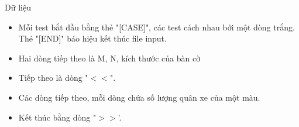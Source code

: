 Dữ liệu
\begin{itemize}
	\item     Mỗi test bắt đầu bằng thẻ "[CASE]", các test cách nhau bởi một dòng trắng. Thẻ "[END]" báo hiệu kết thúc file input.   
	\item     Hai dòng tiếp theo là M, N, kích thước của bàn cờ   
	\item     Tiếp theo là dòng "$<$$<$".   
	\item     Các dòng tiếp theo, mỗi dòng chứa số lượng quân xe của một màu.   
	\item     Kết thúc bằng dòng "$>$$>$'.   
\end{itemize}